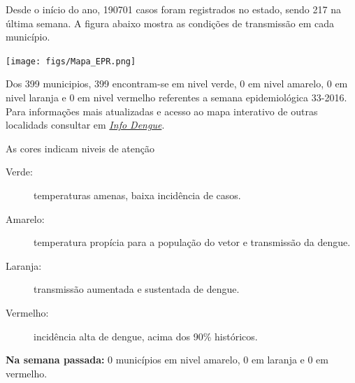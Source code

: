 \documentclass[10pt]{article} %
\begin{document}
\begin{minipage}[t]{.66\linewidth} %

\hypertarget{estado}{} %

Desde o início do ano, 190701 casos foram registrados no estado, sendo 217 na última semana. A figura abaixo mostra as condições de transmissão em cada município.

\texttt{[image: figs/Mapa\_EPR.png]}

Dos 399 municipios, 399 encontram-se em nivel verde, 0 em nivel amarelo, 0 em nivel laranja e 0 em nivel vermelho referentes a semana epidemiológica 33-2016. Para informações mais atualizadas e acesso ao mapa interativo de outras localidads consultar em \href{http://info.dengue.mat.br}{\textit{Info Dengue}}.


\vspace{1cm}
\begin{mdframed}[style=intextbox,frametitle={}] %

\hypertarget{descriptivebox}{} %
As cores indicam niveis de atenção
\begin{description}
\item[Verde:] temperaturas amenas, baixa incidência de casos.      
\item[Amarelo:] temperatura propícia para a população do vetor e transmissão da dengue.
\item[Laranja:] transmissão aumentada e sustentada de dengue. 
\item[Vermelho:] incidência alta de dengue, acima dos 90\% históricos.
\end{description}
\end{mdframed}

 \textbf{Na semana passada:} 0 municípios em nivel amarelo, 0 em laranja e 0 em vermelho.    

\end{minipage} %
\end{document}
